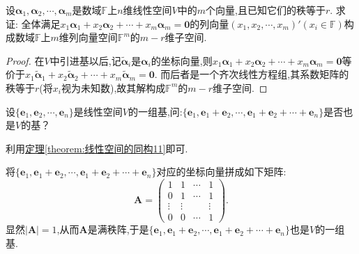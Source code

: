 \documentclass[../../main.tex]{subfiles}%
\begin{document}
\begin{proposition}\label{proposition:向量方程的解空间}
设\(\boldsymbol{\alpha}_1,\boldsymbol{\alpha}_2,\cdots,\boldsymbol{\alpha}_m\)是数域\(\mathbb{F}\)上\(n\)维线性空间\(V\)中的\(m\)个向量,且已知它们的秩等于\(r\). 求证: 全体满足\(x_1\boldsymbol{\alpha}_1 + x_2\boldsymbol{\alpha}_2+\cdots + x_m\boldsymbol{\alpha}_m = \boldsymbol{0}\)的列向量\((x_1,x_2,\cdots,x_m)'(x_i\in\mathbb{F})\)构成数域\(\mathbb{F}\)上\(m\)维列向量空间\(\mathbb{F}^m\)的\(m - r\)维子空间.
\end{proposition}
\begin{proof}

在\(V\)中引进基以后,记\(\widetilde{\boldsymbol{\alpha}}_i\)是\(\boldsymbol{\alpha}_i\)的坐标向量,则\(x_1\boldsymbol{\alpha}_1 + x_2\boldsymbol{\alpha}_2+\cdots + x_m\boldsymbol{\alpha}_m = \boldsymbol{0}\)等价于\(x_1\widetilde{\boldsymbol{\alpha}}_1 + x_2\widetilde{\boldsymbol{\alpha}}_2+\cdots + x_m\widetilde{\boldsymbol{\alpha}}_m = \boldsymbol{0}\). 而后者是一个齐次线性方程组,其系数矩阵的秩等于\(r\)(将\(x_i\)视为未知数),故其解构成\(\mathbb{F}^m\)的\(m - r\)维子空间.

\end{proof}


\begin{example}
设\(\{\boldsymbol{e}_1,\boldsymbol{e}_2,\cdots,\boldsymbol{e}_n\}\)是线性空间\(V\)的一组基,问:\(\{\boldsymbol{e}_1,\boldsymbol{e}_1+\boldsymbol{e}_2,\cdots,\boldsymbol{e}_1+\boldsymbol{e}_2+\cdots+\boldsymbol{e}_n\}\)是否也是\(V\)的基？
\end{example}
\begin{note}
利用\hyperref[theorem:线性空间的同构11]{定理\ref{theorem:线性空间的同构11}}即可.
\end{note}
\begin{solution}

将\(\{\boldsymbol{e}_1,\boldsymbol{e}_1+\boldsymbol{e}_2,\cdots,\boldsymbol{e}_1+\boldsymbol{e}_2+\cdots+\boldsymbol{e}_n\}\)对应的坐标向量拼成如下矩阵:
\[
\boldsymbol{A}=\begin{pmatrix}
1&1&\cdots&1\\
0&1&\cdots&1\\
\vdots&\vdots&&\vdots\\
0&0&\cdots&1
\end{pmatrix}.
\]
显然\(|\boldsymbol{A}| = 1\),从而\(\boldsymbol{A}\)是满秩阵,于是\(\{\boldsymbol{e}_1,\boldsymbol{e}_1+\boldsymbol{e}_2,\cdots,\boldsymbol{e}_1+\boldsymbol{e}_2+\cdots+\boldsymbol{e}_n\}\)也是\(V\)的一组基. 

\end{solution}
\end{document}
